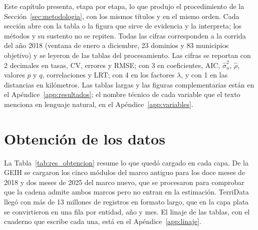 
\label{sec:resultados}

Este capítulo presenta, etapa por etapa, lo que produjo el procedimiento de la Sección~\ref{sec:metodologia}, con los mismos títulos y en el mismo orden. Cada sección abre con la tabla o la figura que sirve de evidencia y la interpreta; los métodos y su sustento no se repiten. Todas las cifras corresponden a la corrida del año 2018 (ventana de enero a diciembre, 23 dominios y 83 municipios objetivo) y se leyeron de las tablas del procesamiento.
Las cifras se reportan con 2 decimales en tasas, CV, errores y RMSE; con 3 en coeficientes, AIC, $\hat{\sigma}_u^2$, $\hat{\rho}$, valores $p$ y $q$, correlaciones y LRT; con 4 en los factores $\lambda$, y con 1 en las distancias en kilómetros. Las tablas largas y las figuras complementarias están en el Apéndice~\ref{app:resultados}; el nombre técnico de cada variable que el texto menciona en lenguaje natural, en el Apéndice~\ref{app:variables}.

\section{Obtención de los datos}
\label{sec:res_obtencion}

La Tabla~\ref{tab:res_obtencion} resume lo que quedó cargado en cada capa. De la GEIH se cargaron los cinco módulos del marco antiguo para los doce meses de 2018 y dos meses de 2025 del marco nuevo, que se procesaron para comprobar que la cadena admite ambos marcos pero no entran en la estimación. TerriData llegó con más de 13 millones de registros en formato largo, que en la capa plata se convirtieron en una fila por entidad, año y mes. El linaje de las tablas, con el cuaderno que escribe cada una, está en el Apéndice~\ref{app:linaje}.

